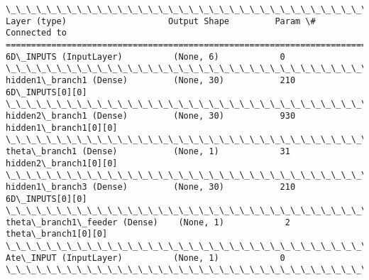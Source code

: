 \documentclass[11pt]{article}
\begin{document}
    \begin{Verbatim}[commandchars=\\\{\}]
\_\_\_\_\_\_\_\_\_\_\_\_\_\_\_\_\_\_\_\_\_\_\_\_\_\_\_\_\_\_\_\_\_\_\_\_\_\_\_\_\_\_\_\_\_\_\_\_\_\_\_\_\_\_\_\_\_\_\_\_\_\_\_\_\_\_\_\_\_\_\_\_\_\_\_\_\_\_\_\_\_\_\_\_\_\_\_\_\_\_\_\_\_\_\_\_\_\_
Layer (type)                    Output Shape         Param \#     Connected to                     
==================================================================================================
6D\_INPUTS (InputLayer)          (None, 6)            0                                            
\_\_\_\_\_\_\_\_\_\_\_\_\_\_\_\_\_\_\_\_\_\_\_\_\_\_\_\_\_\_\_\_\_\_\_\_\_\_\_\_\_\_\_\_\_\_\_\_\_\_\_\_\_\_\_\_\_\_\_\_\_\_\_\_\_\_\_\_\_\_\_\_\_\_\_\_\_\_\_\_\_\_\_\_\_\_\_\_\_\_\_\_\_\_\_\_\_\_
hidden1\_branch1 (Dense)         (None, 30)           210         6D\_INPUTS[0][0]                  
\_\_\_\_\_\_\_\_\_\_\_\_\_\_\_\_\_\_\_\_\_\_\_\_\_\_\_\_\_\_\_\_\_\_\_\_\_\_\_\_\_\_\_\_\_\_\_\_\_\_\_\_\_\_\_\_\_\_\_\_\_\_\_\_\_\_\_\_\_\_\_\_\_\_\_\_\_\_\_\_\_\_\_\_\_\_\_\_\_\_\_\_\_\_\_\_\_\_
hidden2\_branch1 (Dense)         (None, 30)           930         hidden1\_branch1[0][0]            
\_\_\_\_\_\_\_\_\_\_\_\_\_\_\_\_\_\_\_\_\_\_\_\_\_\_\_\_\_\_\_\_\_\_\_\_\_\_\_\_\_\_\_\_\_\_\_\_\_\_\_\_\_\_\_\_\_\_\_\_\_\_\_\_\_\_\_\_\_\_\_\_\_\_\_\_\_\_\_\_\_\_\_\_\_\_\_\_\_\_\_\_\_\_\_\_\_\_
theta\_branch1 (Dense)           (None, 1)            31          hidden2\_branch1[0][0]            
\_\_\_\_\_\_\_\_\_\_\_\_\_\_\_\_\_\_\_\_\_\_\_\_\_\_\_\_\_\_\_\_\_\_\_\_\_\_\_\_\_\_\_\_\_\_\_\_\_\_\_\_\_\_\_\_\_\_\_\_\_\_\_\_\_\_\_\_\_\_\_\_\_\_\_\_\_\_\_\_\_\_\_\_\_\_\_\_\_\_\_\_\_\_\_\_\_\_
hidden1\_branch3 (Dense)         (None, 30)           210         6D\_INPUTS[0][0]                  
\_\_\_\_\_\_\_\_\_\_\_\_\_\_\_\_\_\_\_\_\_\_\_\_\_\_\_\_\_\_\_\_\_\_\_\_\_\_\_\_\_\_\_\_\_\_\_\_\_\_\_\_\_\_\_\_\_\_\_\_\_\_\_\_\_\_\_\_\_\_\_\_\_\_\_\_\_\_\_\_\_\_\_\_\_\_\_\_\_\_\_\_\_\_\_\_\_\_
theta\_branch1\_feeder (Dense)    (None, 1)            2           theta\_branch1[0][0]              
\_\_\_\_\_\_\_\_\_\_\_\_\_\_\_\_\_\_\_\_\_\_\_\_\_\_\_\_\_\_\_\_\_\_\_\_\_\_\_\_\_\_\_\_\_\_\_\_\_\_\_\_\_\_\_\_\_\_\_\_\_\_\_\_\_\_\_\_\_\_\_\_\_\_\_\_\_\_\_\_\_\_\_\_\_\_\_\_\_\_\_\_\_\_\_\_\_\_
Ate\_INPUT (InputLayer)          (None, 1)            0                                            
\_\_\_\_\_\_\_\_\_\_\_\_\_\_\_\_\_\_\_\_\_\_\_\_\_\_\_\_\_\_\_\_\_\_\_\_\_\_\_\_\_\_\_\_\_\_\_\_\_\_\_\_\_\_\_\_\_\_\_\_\_\_\_\_\_\_\_\_\_\_\_\_\_\_\_\_\_\_\_\_\_\_\_\_\_\_\_\_\_\_\_\_\_\_\_\_\_\_

\end{Verbatim}
\end{document}
